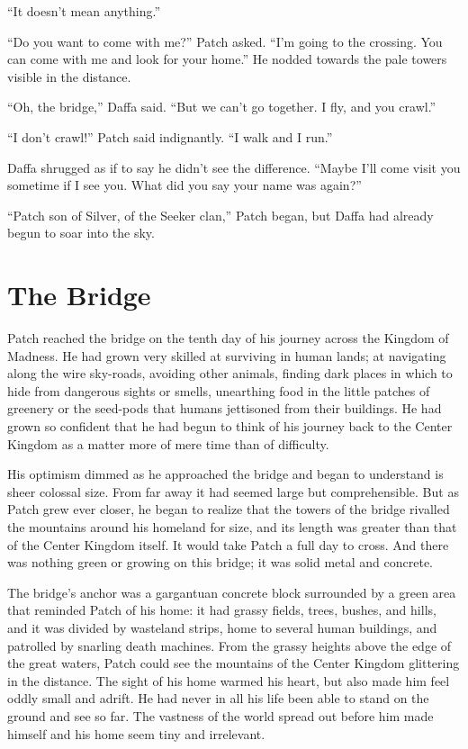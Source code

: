 \documentclass[ebook,oneside,openany,17pt]{memoir}
\renewcommand{\thechapter}{\Roman{chapter}}
\newcounter{sections}
\newcommand{\sections}[1]{%
  \section*{#1}
  \addtocounter{sections}{1}%
  \pdfbookmark[1]{#1}{section.\thechapter.\thesections}}
\begin{document}
“It doesn’t mean anything.”

“Do you want to come with me?” Patch asked. “I’m going to the
crossing. You can come with me and look for your home.” He nodded
towards the pale towers visible in the distance.

“Oh, the bridge,” Daffa said. “But we can’t go together. I fly, and
you crawl.”

“I don’t crawl!” Patch said indignantly. “I walk and I run.”

Daffa shrugged as if to say he didn’t see the difference. “Maybe I’ll
come visit you sometime if I see you. What did you say your name was
again?”

“Patch son of Silver, of the Seeker clan,” Patch began, but Daffa had
already begun to soar into the sky.


\sections{The Bridge}

Patch reached the bridge on the tenth day of his journey across the
Kingdom of Madness. He had grown very skilled at surviving in human
lands; at navigating along the wire sky-roads, avoiding other animals,
finding dark places in which to hide from dangerous sights or smells,
unearthing food in the little patches of greenery or the seed-pods
that humans jettisoned from their buildings. He had grown so confident
that he had begun to think of his journey back to the Center Kingdom
as a matter more of mere time than of difficulty.

His optimism dimmed as he approached the bridge and began to
understand is sheer colossal size. From far away it had seemed large
but comprehensible. But as Patch grew ever closer, he began to realize
that the towers of the bridge rivalled the mountains around his
homeland for size, and its length was greater than that of the Center
Kingdom itself. It would take Patch a full day to cross. And there was
nothing green or growing on this bridge; it was solid metal and
concrete.

The bridge’s anchor was a gargantuan concrete block surrounded by a
green area that reminded Patch of his home: it had grassy fields,
trees, bushes, and hills, and it was divided by wasteland strips, home
to several human buildings, and patrolled by snarling death
machines. From the grassy heights above the edge of the great waters,
Patch could see the mountains of the Center Kingdom glittering in the
distance. The sight of his home warmed his heart, but also made him
feel oddly small and adrift. He had never in all his life been able to
stand on the ground and see so far. The vastness of the world spread
out before him made himself and his home seem tiny and irrelevant.
\end{document}
